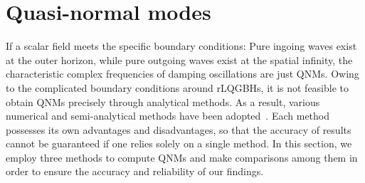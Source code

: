 \documentclass[12pt]{article}
\begin{document}
\section{Quasi-normal modes}\label{sec:QNM}
 If a scalar field meets the specific boundary conditions: Pure ingoing waves exist at the outer horizon, while pure outgoing waves exist at the spatial infinity, the characteristic complex frequencies of damping oscillations are just QNMs.
Owing to the  complicated boundary conditions around rLQGBHs, it is not feasible to obtain QNMs precisely through analytical methods. 
As a result, various numerical and semi-analytical methods have been adopted~\cite{Konoplya:2011qq, Kokkotas-Schmidt-1999, Li:2022kch, Berti:2007dg, Chandrasekhar:1975zza, Molina:2010fb, Franzin:2022iai, Iyer:1986nq, Seidel:1989bp}. 
Each method possesses its own advantages and disadvantages, so that the accuracy of results cannot be guaranteed if one relies solely on a single method. 
In this section, we employ three methods to compute QNMs and make comparisons among them in order to ensure the accuracy and reliability of our findings.

\end{document}
